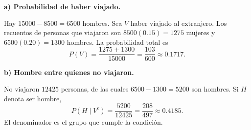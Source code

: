 \textbf{a) Probabilidad de haber viajado.}\par\nopagebreak[4]
Hay $15000-8500=6500$ hombres. Sea $V$ haber viajado al extranjero. Los recuentos de personas que viajaron son $8500(0.15)=1275$ mujeres y $6500(0.20)=1300$ hombres. La probabilidad total es
\[
\boxed{P(V)=\frac{1275+1300}{15000}=\frac{103}{600}\approx0.1717.}
\]

\textbf{b) Hombre entre quienes no viajaron.}\par\nopagebreak[4]
No viajaron $12425$ personas, de las cuales $6500-1300=5200$ son hombres. Si $H$ denota ser hombre,
\[
\boxed{P(H\mid V^c)=\frac{5200}{12425}=\frac{208}{497}\approx0.4185.}
\]
El denominador es el grupo que cumple la condición.
